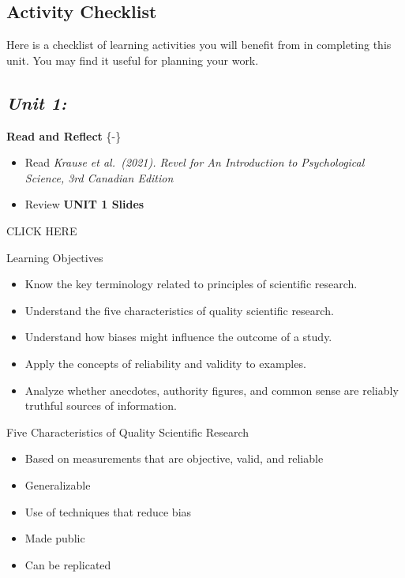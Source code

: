 \documentclass[
]{book}
\providecommand{\tightlist}{%
  \setlength{\itemsep}{0pt}\setlength{\parskip}{0pt}}
\begin{document}
\hypertarget{activity-checklist}{%
\subsection*{Activity Checklist}\label{activity-checklist}}

Here is a checklist of learning activities you will benefit from in completing this unit. You may find it useful for planning your work.

\hypertarget{unit-1}{%
\subsection*{\texorpdfstring{\textbf{\emph{Unit 1:}}}{Unit 1:}}\label{unit-1}}

\textbf{Read and Reflect} \{-\}

\begin{itemize}
\tightlist
\item
  Read \emph{Krause et al.~(2021). Revel for An Introduction to Psychological Science, 3rd Canadian Edition}\\
\item
  Review \textbf{UNIT 1 Slides}
\end{itemize}

CLICK HERE

Learning Objectives

\begin{itemize}
\tightlist
\item
  Know the key terminology related to principles of scientific research.\\
\item
  Understand the five characteristics of quality scientific research.\\
\item
  Understand how biases might influence the outcome of a study.\\
\item
  Apply the concepts of reliability and validity to examples.\\
\item
  Analyze whether anecdotes, authority figures, and common sense are reliably truthful sources of information.
\end{itemize}

Five Characteristics of Quality Scientific Research

\begin{itemize}
\tightlist
\item
  Based on measurements that are objective, valid, and reliable\\
\item
  Generalizable\\
\item
  Use of techniques that reduce bias\\
\item
  Made public\\
\item
  Can be replicated
\end{itemize}
\end{document}
